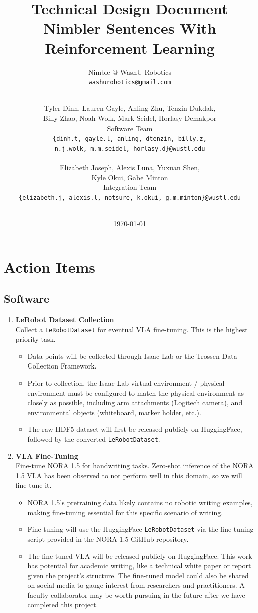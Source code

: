 \documentclass[12pt,a4paper]{article}
\title{\textbf{Technical Design Document}\\[0.5em]\large Nimbler Sentences With Reinforcement Learning}
\author{Nimble @ WashU Robotics \\ \texttt{washurobotics@gmail.com}}
\author{
    \\
    Tyler Dinh, Lauren Gayle, Anling Zhu, Tenzin Dukdak, \\
    Billy Zhao, Noah Wolk, Mark Seidel, Horlasy Demakpor \\[0.3em]
    Software Team \\[0.2em]
    \texttt{\{dinh.t, gayle.l, anling, dtenzin, billy.z,} \\
    \texttt{n.j.wolk, m.m.seidel, horlasy.d\}@wustl.edu} \\\\
    Elizabeth Joseph, Alexis Luna, Yuxuan Shen, \\
    Kyle Okui, Gabe Minton \\[0.3em]
    Integration Team \\[0.2em]
    \texttt{\{elizabeth.j, alexis.l, notsure, k.okui, g.m.minton\}@wustl.edu}\\\\
}
\date{\today}
\begin{document}
\maketitle
\newpage
\tableofcontents
\newpage

\section*{Action Items}
\subsection*{Software}

\begin{enumerate}

  \item \textbf{LeRobot Dataset Collection} \\
  Collect a \texttt{LeRobotDataset} for eventual VLA fine-tuning. This is the highest priority task.
  \begin{itemize}
    \item Data points will be collected through Isaac Lab or the Trossen Data Collection Framework.
    \item Prior to collection, the Isaac Lab virtual environment / physical environment must be configured to match the physical environment as closely as possible, including arm attachments (Logitech camera), and environmental objects (whiteboard, marker holder, etc.).
    \item The raw HDF5 dataset will first be released publicly on HuggingFace, followed by the converted \texttt{LeRobotDataset}.
  \end{itemize}

  \item \textbf{VLA Fine-Tuning} \\
  Fine-tune NORA 1.5 for handwriting tasks. Zero-shot inference of the NORA 1.5 VLA has been observed to not perform well in this domain, so we will fine-tune it.
  \begin{itemize}
    \item NORA 1.5's pretraining data likely contains no robotic writing examples, making fine-tuning essential for this specific scenario of writing.
    \item Fine-tuning will use the HuggingFace \texttt{LeRobotDataset} via the fine-tuning script provided in the NORA 1.5 GitHub repository.
    \item The fine-tuned VLA will be released publicly on HuggingFace. This work has potential for academic writing, like a technical white paper or report given the project's structure. The fine-tuned model could also be shared on social media to gauge interest from researchers and practitioners. A faculty collaborator may be worth pursuing in the future after we have completed this project.
  \end{itemize}

\end{enumerate}
\end{document}
